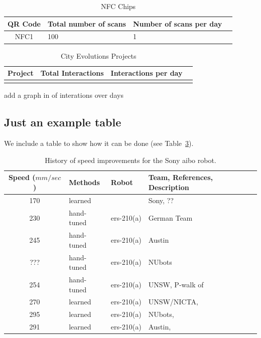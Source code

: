 \documentclass[a4,12pt]{article}
\newenvironment{boxit}{\begin{lrbox}{\savepar}
        \begin{minipage}[b]{4.6in}}
        {\end{minipage}\end{lrbox}\fbox{\usebox{\savepar}}}
\begin{document}
\begin{table}[h!]
    \begin{center}
    \leavevmode 
    \small
    \begin{tabular}{|cll|l|}\hline
        QR Code & Total number of scans & Number of scans per day\\[0.1cm]\hline
        NFC1 & 100 & 1\\\hline
    \end{tabular}
    \end{center}
    \caption{NFC Chips}
    \label{table:nfcchips}
\end{table}

\begin{table}[h!]
    \begin{center}
    \leavevmode
    \begin{tabular}{|cll|l|}\hline
        Project & Total Interactions & Interactions per day\\[0.1cm]\hline
        \\\hline
    \end{tabular}
    \end{center}
    \caption{City Evolutions Projects}
    \label{table:cityEvolutionsProjects}
\end{table}

add a graph in of interations over days
\subsection{Just an example table}
We include a table to show how it can be done (see Table~\ref{table:ListOfVelocities}).
%
\begin{table}[h!]
\begin{center}
\leavevmode
\small %
\begin{tabular}{|cll|l|}\hline
%
Speed (${mm}/{sec}$) & Methods & Robot & Team, References, Description\\[0.1cm]\hline
%
170& learned & & Sony, \citep{HornbyEtAl1999}??\\%
%
230& hand-tuned & {\sc ers}-210(a) & German Team  \\%
%
245& hand-tuned & {\sc ers}-210(a) &Austin  \\%
%
???& hand-tuned & {\sc ers}-210(a) &NUbots  \\%
%
254& hand-tuned & {\sc ers}-210(a) &UNSW, P-walk of \citep{HengstEtAl2001}\\%
%
270& learned & {\sc ers}-210(a) &UNSW/NICTA, \citep{KimUther2003}\\%
%
295& learned & {\sc ers}-210(a) &NUbots,
\citep{QuinlanChalupMiddletonACRA2003}\\%
%
291& learned & {\sc ers}-210(a) &Austin, \citep{KohlStone2004}\\\hline
%
\end{tabular}
\end{center}
\caption{History of speed improvements for the Sony {\sc aibo}
robot.} \label{table:ListOfVelocities}
\end{table}
%
\end{document}
